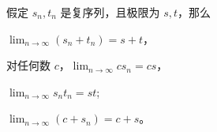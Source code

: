 \documentclass[../poma-notes.tex]{subfiles}
\begin{document}
\begin{anote}
  假定 ${s_n}, {t_n}$ 是复序列，且极限为 $s, t$，那么
  \begin{enumerate*}[label=(\alph*)]
    \item $\lim_{n \to \infty}(s_n + t_n) = s + t$，
    \item 对任何数 $c$，$\lim_{n \to \infty} cs_n = cs$，
    \item $\lim_{n \to \infty} s_n t_n = st$;
    \item $\lim_{n \to \infty}(c + s_n) = c + s$。
  \end{enumerate*}
\end{anote}
\end{document}
